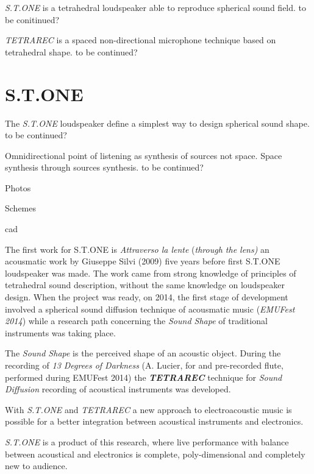 \documentclass{article}
\begin{document}
\emph{S.T.ONE} is a tetrahedral loudspeaker able to reproduce spherical sound field. to be conitinued?

\emph{TETRAREC} is a spaced non-directional microphone technique based on tetrahedral shape. to be continued?


\section{S.T.ONE}
\label{sec:stone}

The \emph{S.T.ONE} loudspeaker define a simplest way to design spherical sound shape. to be continued?

Omnidirectional point of listening as synthesis of sources not space.
Space synthesis through sources synthesis. to be continued?

Photos

Schemes

cad

The first work for S.T.ONE is \emph{Attraverso la lente} (\emph{through the lens)}
an acousmatic work by Giuseppe Silvi (2009) five years before first S.T.ONE loudspeaker
was made. The work came from strong knowledge of principles of tetrahedral sound description,
without the same knowledge on loudspeaker design. When the project was ready, on 2014,
the first stage of development involved a spherical sound diffusion technique of acousmatic
music (\emph{EMUFest 2014}) while a research path concerning the \emph{Sound Shape} of
traditional instruments was taking place.

The \emph{Sound Shape} is the perceived shape of an acoustic object. During  the recording of
\emph{13 Degrees of Darkness} (A. Lucier, for and pre-recorded flute, performed during
EMUFest 2014) the \emph{\textbf{TETRAREC}} technique for \emph{Sound Diffusion} recording
of acoustical instruments was developed.

With \emph{S.T.ONE} and \emph{TETRAREC} a new approach to electroacoustic music is possible
for a better integration between acoustical instruments and electronics.

\emph{S.T.ONE} is a product of this research, where live performance with balance between
acoustical and electronics is complete, poly-dimensional and completely new to audience.
\end{document}

